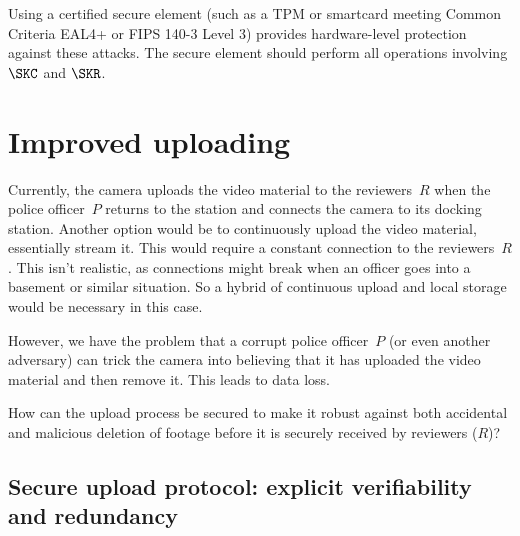 Using a certified secure element (such as a \ac{TPM} or smartcard meeting
Common Criteria EAL4+ or FIPS 140-3 Level 3) provides hardware-level
protection against these attacks.
The secure element should perform all operations involving \(\SKC\) and 
\(\SKR\).


\section{Improved uploading}


Currently, the camera uploads the video material to the reviewers~\(R\) when
the police officer~\(P\) returns to the station and connects the camera to its 
docking station.
Another option would be to continuously upload the video material, essentially 
stream it.
This would require a constant connection to the reviewers~\(R\).
This isn't realistic, as connections might break when an officer goes into a 
basement or similar situation.
So a hybrid of continuous upload and local storage would be necessary in this 
case.

However, we have the problem that a corrupt police officer~\(P\) (or even 
another adversary) can trick the camera into believing that it has uploaded the 
video material and then remove it.
This leads to data loss.

\begin{exercise}
  How can the upload process be secured to make it robust against both 
  accidental and malicious deletion of footage before it is securely received 
  by reviewers (\(R\))?
\end{exercise}

\subsection{Secure upload protocol: explicit verifiability and redundancy}

